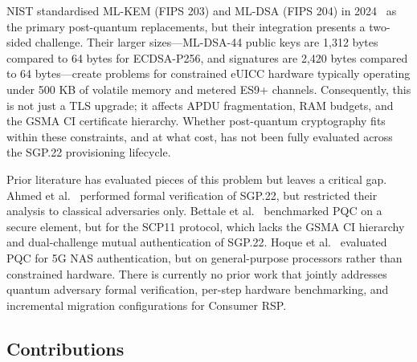 \documentclass[a4paper,fleqn]{cas-sc}
\begin{document}
NIST standardised ML-KEM (FIPS 203) and ML-DSA (FIPS 204) in 2024~\cite{nist2024pqc}
as the primary post-quantum replacements, but their integration presents a two-sided
challenge. Their larger sizes---ML-DSA-44 public keys are 1,312 bytes compared to
64 bytes for ECDSA-P256, and signatures are 2,420 bytes compared to 64 bytes---create
problems for constrained eUICC hardware typically operating under 500 KB of volatile
memory and metered ES9+ channels. Consequently, this is not just a TLS upgrade;
it affects APDU fragmentation, RAM budgets, and the GSMA CI certificate hierarchy.
Whether post-quantum cryptography fits within these constraints, and at what cost,
has not been fully evaluated across the SGP.22 provisioning lifecycle.

Prior literature has evaluated pieces of this problem but leaves a critical gap.
Ahmed et al.~\cite{ahmed2024rsp} performed formal verification of SGP.22, but
restricted their analysis to classical adversaries only. Bettale et al.~\cite{bettale2025pqesim}
benchmarked PQC on a secure element, but for the SCP11 protocol, which lacks the
GSMA CI hierarchy and dual-challenge mutual authentication of SGP.22.
Hoque et al.~\cite{hoque2025pqc5g} evaluated PQC for 5G NAS authentication, but
on general-purpose processors rather than constrained hardware. There is currently
no prior work that jointly addresses quantum adversary formal verification,
per-step hardware benchmarking, and incremental migration configurations for
Consumer RSP.

\subsection{Contributions}
\end{document}
